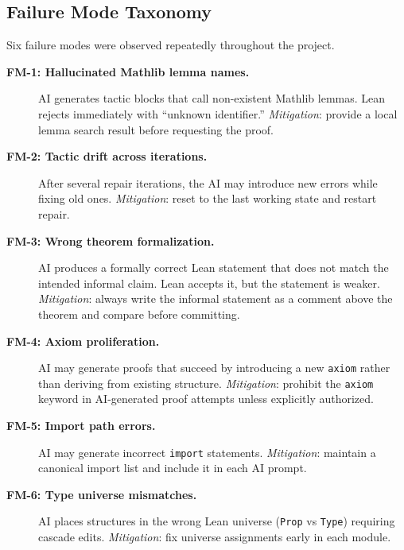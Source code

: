 \subsection{Failure Mode Taxonomy}

Six failure modes were observed repeatedly throughout the project.

\begin{description}
  \item[\textbf{FM-1: Hallucinated Mathlib lemma names.}]
        AI generates tactic blocks that call non-existent Mathlib lemmas. Lean
        rejects immediately with ``unknown identifier.''
        \emph{Mitigation}: provide a local lemma search result before requesting
        the proof.

  \item[\textbf{FM-2: Tactic drift across iterations.}]
        After several repair iterations, the AI may introduce new errors while
        fixing old ones.
        \emph{Mitigation}: reset to the last working state and restart repair.

  \item[\textbf{FM-3: Wrong theorem formalization.}]
        AI produces a formally correct Lean statement that does not match the
        intended informal claim. Lean accepts it, but the statement is weaker.
        \emph{Mitigation}: always write the informal statement as a comment above
        the theorem and compare before committing.

  \item[\textbf{FM-4: Axiom proliferation.}]
        AI may generate proofs that succeed by introducing a new \texttt{axiom}
        rather than deriving from existing structure.
        \emph{Mitigation}: prohibit the \texttt{axiom} keyword in AI-generated
        proof attempts unless explicitly authorized.

  \item[\textbf{FM-5: Import path errors.}]
        AI may generate incorrect \texttt{import} statements.
        \emph{Mitigation}: maintain a canonical import list and include it in
        each AI prompt.

  \item[\textbf{FM-6: Type universe mismatches.}]
        AI places structures in the wrong Lean universe (\texttt{Prop} vs
        \texttt{Type}) requiring cascade edits.
        \emph{Mitigation}: fix universe assignments early in each module.
\end{description}

